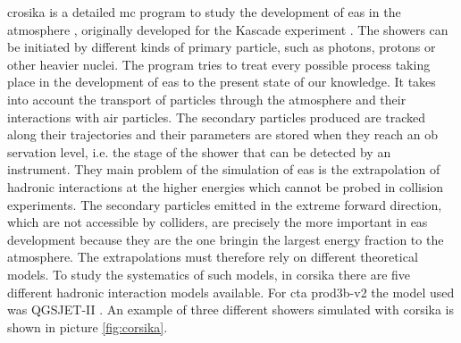 \documentclass[main.tex]{subfiles}
\begin{document}
\gls{crosika} is a detailed \gls{mc} program to study the development of \gls{eas} in the atmosphere \cite{1998Corsika}, originally developed for the Kascade experiment \cite{1997Kascade}. The showers can be initiated by different kinds of primary particle, such as photons, protons or other heavier nuclei. The program tries to treat every possible process taking place in the development of \gls{eas} to the present state of our knowledge. It takes into account the transport of particles through the atmosphere and their interactions with air particles. The secondary particles produced are tracked along their trajectories and their parameters are stored when they reach an ob servation level, i.e. the stage of the shower that can be detected by an instrument. They main problem of the simulation of \gls{eas} is the extrapolation of hadronic interactions at the higher energies which cannot be probed in collision experiments. The secondary particles emitted in the extreme forward direction, which are not accessible by colliders, are precisely the more important in \gls{eas} development because they are the one bringin the largest energy fraction to the atmosphere. The extrapolations must therefore rely on different theoretical models. To study the systematics of such models, in \gls{corsika} there are five different hadronic interaction models available. For \gls{cta} prod3b-v2 the model used was QGSJET-II \cite{2006QGSJET}. An example of three different showers simulated with \gls{corsika} is shown in picture \ref{fig:corsika}.
\end{document}

